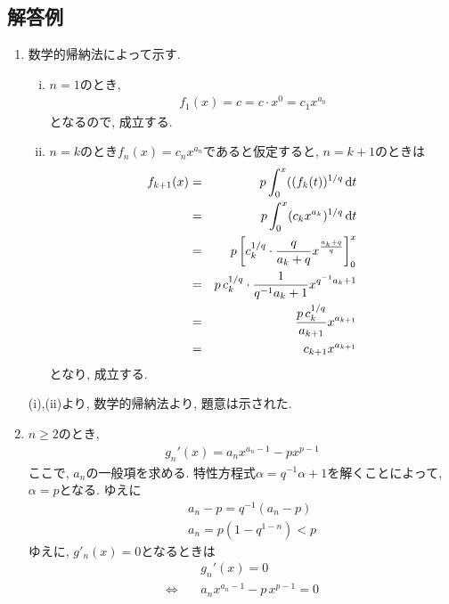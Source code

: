 \documentclass[dvipdfmx,titlepage, 11pt, a4paper]{jsarticle}%
\begin{document}
\subsection{解答例}
\begin{enumerate}[(1)]
	\setlength{\itemsep}{10pt}
	\item 数学的帰納法によって示す.\\
	      \begin{enumerate}[(i)]
		      \item $n=1$のとき,
		            \begin{eqnarray*}
			            f_{1}(x)=c=c\cdot x^{0}=c_{1}x^{a_{0}}
		            \end{eqnarray*}
		            となるので, 成立する.
		      \item $n=k$のとき$f_{n}(x)=c_{n}x^{a_{n}}$であると仮定すると, $n=k+1$のときは
		            \begin{eqnarray*}
			            f_{k+1}(x)&=&p\int_{0}^{x}((f_{k}(t))^{1/q}\,{\rm d} t\\
			            &=&p\int_{0}^{x}(c_{k}x^{a_{k}})^{1/q}\,{\rm d} t\\
			            &=&p\left[c_{k}^{1/q}\cdot \frac{q}{a_{k}+q}x^{\frac{a_{k}+q}{q}}\right]_{0}^{x}\\
			            &=&p\,c_{k}^{1/q}\cdot \frac{1}{q^{-1}a_{k}+1}x^{q^{-1}a_{k}+1}\\
			            &=&\frac{p\,c_{k}^{1/q}}{a_{k+1}}x^{a_{k+1}}\\
			            &=&c_{k+1}x^{a_{k+1}}
		            \end{eqnarray*}
		            となり, 成立する.
	      \end{enumerate}
	      (i),(ii)より, 数学的帰納法より, 題意は示された.
	\item $n\geq 2$のとき,
	      \begin{eqnarray*}
		      g_{n}'(x)=a_{n}x^{a_{n}-1}-px^{p-1}
	      \end{eqnarray*}
	      ここで, $a_{n}$の一般項を求める. 特性方程式$\alpha = q^{-1}\alpha+1$を解くことによって, $\alpha = p$となる. ゆえに
	      \begin{eqnarray*}
		      &&a_{n}-p=q^{-1}\left(a_{n}-p\right)\\
		      &&a_{n}=p\left(1-q^{1-n}\right) < p
	      \end{eqnarray*}
	      ゆえに, $g'_{n}(x)=0$となるときは
	      \begin{eqnarray*}
		      &&g_{n}'(x)=0\\
		      \Longleftrightarrow\ && a_{n}x^{a_{n}-1}-p\,x^{p-1}=0\\

\end{eqnarray*}
\end{enumerate}
\end{document}
